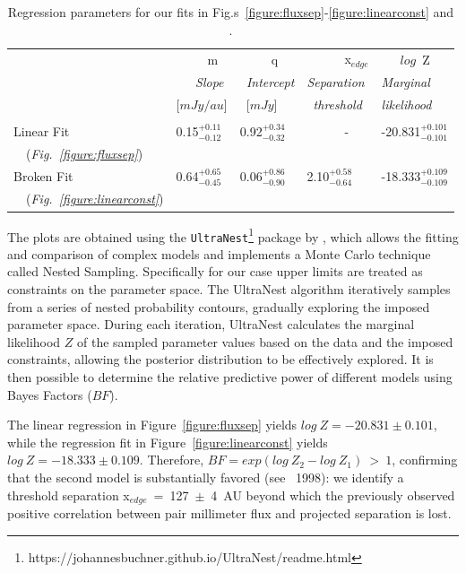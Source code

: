 \documentclass{aa}
\begin{document}
\begin{table}[hbt!]
\caption{Regression parameters for our fits in Fig.s~\ref{figure:fluxsep}-\ref{figure:linearconst} and .}              %
\label{table:bestfits}      %
\centering                                      %
\begin{tabular}{l l l l l}          %
\hline\hline                        %
 & ~~~~~m & ~~~~~q & ~~~~~~x$_{edge}$  & ~~~$log$~Z \\
 & \textit{~~~Slope} & \textit{~Intercept} & \textit{Separation} &\textit{Marginal} \\
 & [$mJy/au$] & ~[$mJy$] & \textit{~threshold} &\textit{likelihood} \\
\hline\hline 
    & & & \\
   \small{Linear Fit} & \small{0.15$^{+0.11}_{-0.12}$} & \small{0.92$^{+0.34}_{-0.32}$} & ~~~~~~- & \small{-20.831$^{+0.101}_{-0.101}$} \\ 
   ~~\small{(\textit{Fig.~\ref{figure:fluxsep}})} & & & \\
   \small{Broken Fit} & \small{0.64$^{+0.65}_{-0.45}$} & \small{0.06$^{+0.86}_{-0.90}$} & \small{2.10$^{+0.58}_{-0.64}$} & \small{-18.333$^{+0.109}_{-0.109}$} \\
   ~~\small{(\textit{Fig.~\ref{figure:linearconst}})} & & & \\
\hline
\end{tabular}
\end{table}

The plots are obtained using the \texttt{UltraNest}\footnote{https://johannesbuchner.github.io/UltraNest/readme.html} package by \cite{Buchner16}, which allows the fitting and comparison of complex models and implements a Monte Carlo technique called Nested Sampling. Specifically for our case upper limits are treated as constraints on the parameter space. The UltraNest algorithm iteratively samples from a series of nested probability contours, gradually exploring the imposed parameter space. During each iteration, UltraNest calculates the marginal likelihood $Z$ of the sampled parameter values based on the data and the imposed constraints, allowing the posterior distribution to be effectively explored. It is then possible to determine the relative predictive power of different models using Bayes Factors ($BF$). \par
The linear regression in Figure~\ref{figure:fluxsep} yields $log~Z=-20.831\pm0.101$, while the regression fit in Figure~\ref{figure:linearconst} yields $log~Z=-18.333\pm0.109$. Therefore, $BF=exp(log~Z_2 - log~Z_1)~>~1$, confirming that the second model is substantially favored (see \citeauthor{Jeffreys98}~1998): we identify a threshold separation x$_{edge}$~=~127~$\pm$~4~AU beyond which the previously observed positive correlation between pair millimeter flux and projected separation is lost. 
\end{document}
